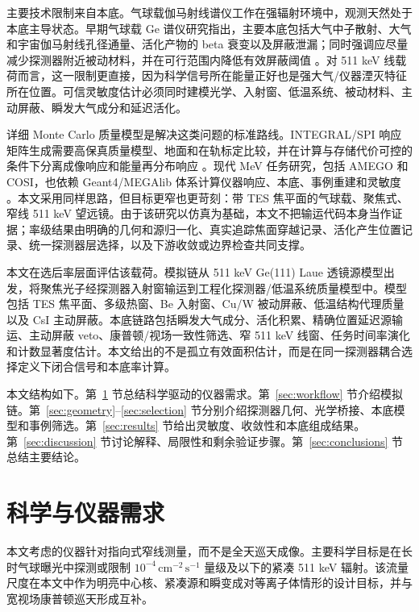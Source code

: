 \documentclass[preprint,12pt]{elsarticle}
\newcommand{\cms}{\,\mathrm{cm^{-2}\,s^{-1}}}
\begin{document}
主要技术限制来自本底。气球载伽马射线谱仪工作在强辐射环境中，观测天然处于本底主导状态。早期气球载 Ge 谱仪研究指出，主要本底包括大气中子散射、大气和宇宙伽马射线孔径通量、活化产物的 beta 衰变以及屏蔽泄漏；同时强调应尽量减少探测器附近被动材料，并在可行范围内降低有效屏蔽阈值 \cite{Gehrels1985}。对 511 keV 线载荷而言，这一限制更直接，因为科学信号所在能量正好也是强大气/仪器湮灭特征所在位置。可信灵敏度估计必须同时建模光学、入射窗、低温系统、被动材料、主动屏蔽、瞬发大气成分和延迟活化。

详细 Monte Carlo 质量模型是解决这类问题的标准路线。INTEGRAL/\allowbreak SPI 响应矩阵生成需要高保真质量模型、地面和在轨标定比较，并在计算与存储代价可控的条件下分离成像响应和能量再分布响应 \cite{Sturner2003}。现代 MeV 任务研究，包括 AMEGO 和 COSI，也依赖 Geant4/MEGAlib 体系计算仪器响应、本底、事例重建和灵敏度 \cite{Agostinelli2003,Zoglauer2006,Caputo2017,Karwin2023,Gallego2025}。本文采用同样思路，但目标更窄也更苛刻：带 TES 焦平面的气球载、聚焦式、窄线 511 keV 望远镜。由于该研究以仿真为基础，本文不把输运代码本身当作证据；率级结果由明确的几何和源归一化、真实追踪焦面穿越记录、活化产生位置记录、统一探测器层选择，以及下游收敛或边界检查共同支撑。

本文在选后率层面评估该载荷。模拟链从 511 keV Ge(111) Laue 透镜源模型出发，将聚焦光子经探测器入射窗输运到工程化探测器/低温系统质量模型中。模型包括 TES 焦平面、多级热窗、Be 入射窗、Cu/W 被动屏蔽、低温结构代理质量以及 CsI 主动屏蔽。本底链路包括瞬发大气成分、活化积累、精确位置延迟源输运、主动屏蔽 veto、康普顿/视场一致性筛选、窄 511 keV 线窗、任务时间率演化和计数显著度估计。本文给出的不是孤立有效面积估计，而是在同一探测器耦合选择定义下闭合信号和本底率计算。

本文结构如下。第~\ref{sec:requirements} 节总结科学驱动的仪器需求。第~\ref{sec:workflow} 节介绍模拟链。第~\ref{sec:geometry}--\ref{sec:selection} 节分别介绍探测器几何、光学桥接、本底模型和事例筛选。第~\ref{sec:results} 节给出灵敏度、收敛性和本底组成结果。第~\ref{sec:discussion} 节讨论解释、局限性和剩余验证步骤。第~\ref{sec:conclusions} 节总结主要结论。

\section{科学与仪器需求}
\label{sec:requirements}

本文考虑的仪器针对指向式窄线测量，而不是全天巡天成像。主要科学目标是在长时气球曝光中探测或限制 $10^{-4}\cms$ 量级及以下的紧凑 511 keV 辐射。该流量尺度在本文中作为明亮中心核、紧凑源和瞬变成对等离子体情形的设计目标，并与宽视场康普顿巡天形成互补。
\end{document}

